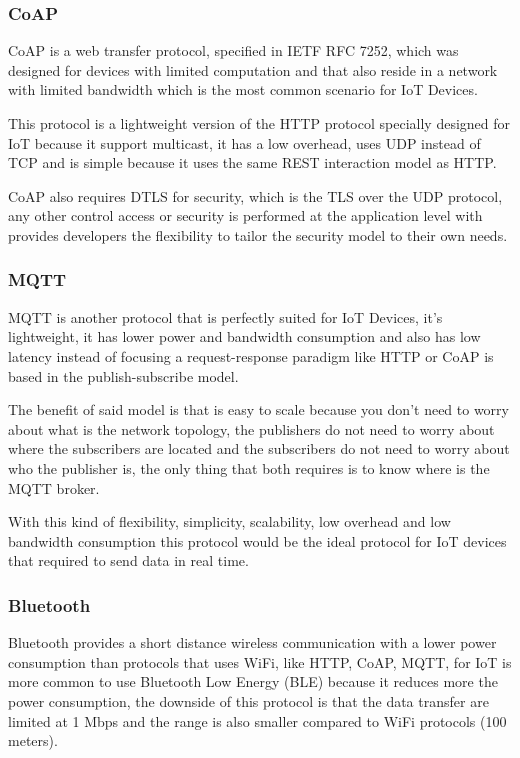 \subsubsection{CoAP}
CoAP is a web transfer protocol, specified in IETF RFC 7252, which was 
designed for devices with limited computation and that also reside in a 
network with limited bandwidth which is the most common scenario for 
IoT Devices.

This protocol is a lightweight version of the HTTP protocol specially 
designed for IoT because it support multicast, it has a low overhead, 
uses UDP instead of TCP and is simple because it uses the same REST 
interaction model as HTTP.

CoAP also requires DTLS for security, which is the TLS over the UDP protocol, 
any other control access or security is performed at the application level with 
provides developers the flexibility to tailor the security model to 
their own needs.

\subsubsection{MQTT}
MQTT is another protocol that is perfectly suited for IoT Devices, it's 
lightweight, it has lower power and bandwidth consumption and also has low 
latency instead of focusing a request-response paradigm like HTTP or CoAP 
is based in the publish-subscribe model.

The benefit of said model is that is easy to scale because you don't need to 
worry about what is the network topology, the publishers do not need to worry 
about where the subscribers are located and the subscribers do not need to 
worry about who the publisher is, the only thing that both requires is to 
know where is the MQTT broker.

With this kind of flexibility, simplicity, scalability, low overhead and low 
bandwidth consumption this protocol would be the ideal protocol for IoT 
devices that required to send data in real time.

\subsubsection{Bluetooth}
Bluetooth provides a short distance wireless communication with a lower power 
consumption than protocols that uses WiFi, like HTTP, CoAP, MQTT, for IoT is 
more common to use Bluetooth Low Energy (BLE) because it reduces more the 
power consumption, the downside of this protocol is that the data transfer
 are limited at 1 Mbps and the range is also smaller compared to WiFi 
 protocols (100 meters).


